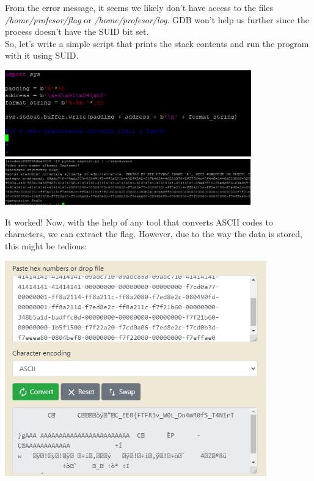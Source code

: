 \documentclass{article}
\begin{document}
From the error message, it seems we likely don’t have access to the files \textit{/home/profesor/flag} or \textit{/home/profesor/log}. GDB won’t help us further since the process doesn’t have the SUID bit set.
\vspace{3mm} \\
So, let’s write a simple script that prints the stack contents and run the program with it using SUID.
\begin{center}
    \includegraphics[width=0.8\textwidth]{"image55.png"}
    \vspace{3mm}
    \includegraphics[width=0.8\textwidth]{"image56.png"}
    \vspace{3mm}
\end{center}
It worked! Now, with the help of any tool that converts ASCII codes to characters, we can extract the flag. However, due to the way the data is stored, this might be tedious:
\begin{center}
    \includegraphics[width=0.85\textwidth]{"image57.png"}
\end{center}
\end{document}
